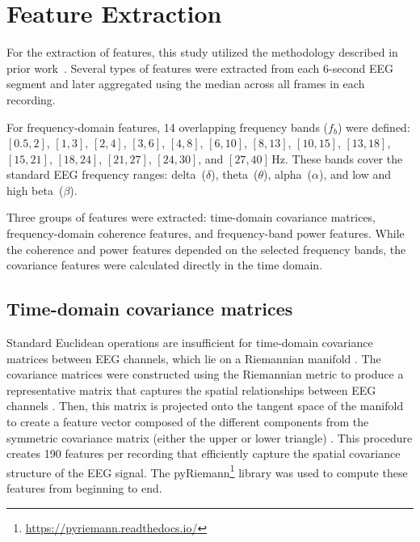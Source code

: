 \documentclass{bachelor2025eng}
\begin{document}
    \section{Feature Extraction}
    \label{sec:features}
        For the extraction of features, this study utilized the methodology described in prior work~\cite{Poziomska2024}. Several types of features were extracted from each 6-second EEG segment and later aggregated using the median across all frames in each recording.

        For frequency-domain features, 14 overlapping frequency bands ($f_b$) were defined: \(\left[0.5, 2\right]\), \(\left[1, 3\right]\), \(\left[2, 4\right]\), \(\left[3, 6\right]\), \(\left[4, 8\right]\), \(\left[6, 10\right]\), \(\left[8, 13\right]\), \(\left[10, 15\right]\), \(\left[13, 18\right]\), \(\left[15, 21\right]\), \(\left[18, 24\right]\), \(\left[21, 27\right]\), \(\left[24, 30\right]\), and \(\left[27, 40\right]\)\,Hz. These bands cover the standard EEG frequency ranges: delta~(\(\delta\)), theta~(\(\theta\)), alpha~(\(\alpha\)), and low and high beta~(\(\beta\)).
        
        Three groups of features were extracted: time-domain covariance matrices, frequency-domain coherence features, and frequency-band power features. While the coherence and power features depended on the selected frequency bands, the covariance features were calculated directly in the time domain.


        \subsection{Time-domain covariance matrices}
            Standard Euclidean operations are insufficient for time-domain covariance matrices between EEG channels, which lie on a Riemannian manifold \cite{congedo2013Riemannian, tibermacine2024riemannian}. The covariance matrices were constructed using the Riemannian metric to produce a representative matrix that captures the spatial relationships between EEG channels \cite{Moakher2005}. Then, this matrix is projected onto the tangent space of the manifold to create a feature vector composed of the different components from the symmetric covariance matrix (either the upper or lower triangle) \cite{Lotte2018}. This procedure creates 190 features per recording that efficiently capture the spatial covariance structure of the EEG signal. The pyRiemann\footnote{\url{https://pyriemann.readthedocs.io/}} library was used to compute these features from beginning to end.
\end{document}
